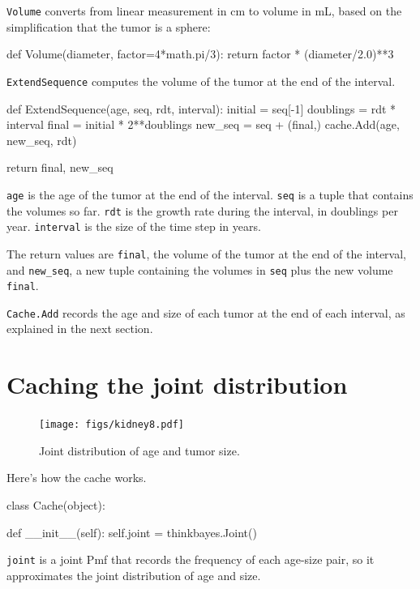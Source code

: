 \documentclass[12pt]{book}
\theoremstyle{exercise}
\newcommand{\py}[1]{{\tt #1}}%
\begin{document}
\py{Volume} converts from linear measurement in cm to volume
in mL, based on the simplification that the tumor is a sphere:

\begin{code}
def Volume(diameter, factor=4*math.pi/3):
    return factor * (diameter/2.0)**3
\end{code}

\py{ExtendSequence} computes the volume of the tumor at the
end of the interval.

\begin{code}
def ExtendSequence(age, seq, rdt, interval):
    initial = seq[-1]
    doublings = rdt * interval
    final = initial * 2**doublings
    new_seq = seq + (final,)
    cache.Add(age, new_seq, rdt)

    return final, new_seq
\end{code}

\py{age} is the age of the tumor at the end of the interval.
\py{seq} is a tuple that contains the volumes so far.  \py{rdt} is
the growth rate during the interval, in doublings per year.
\py{interval} is the size of the time step in years.

The return values are \py{final}, the volume of the
tumor at the end of the interval, and \verb"new_seq", a new
tuple containing the volumes in \py{seq} plus the new volume
\py{final}.

\py{Cache.Add} records the age and size of each tumor at the end
of each interval, as explained in the next section.


\section{Caching the joint distribution}

\begin{figure}
\centerline{\texttt{[image: figs/kidney8.pdf]}}
\caption{Joint distribution of age and tumor size.}
\label{fig.kidney8}
\end{figure}

Here's how the cache works.

\begin{code}
class Cache(object):

    def __init__(self):
        self.joint = thinkbayes.Joint()
\end{code}

\py{joint} is a joint Pmf that records the
frequency of each age-size pair, so it approximates the
joint distribution of age and size.
\end{document}
